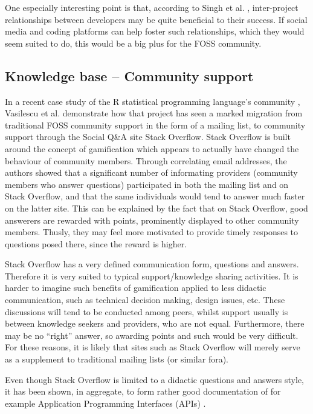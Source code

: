\documentclass[a4paper,11pt]{article} %
\begin{document}
One especially interesting point is that, according to Singh et
al. \cite{singh2011network}, inter-project relationships between developers
may be quite beneficial to their success. If social media and coding
platforms can help foster such relationships, which they would seem suited
to do, this would be a big plus for the FOSS community.

\subsection{Knowledge base -- Community support}

In a recent case study of the R statistical programming language's community
\cite{Vasilescu14StackOverflow}, Vasilescu et al. demonstrate how that
project has seen a marked migration from traditional FOSS community support
in the form of a mailing list, to community support through the Social
Q\&{}A site Stack Overflow. Stack Overflow is built around the concept of
gamification\cite{deterding2011game} which appears to actually have changed
the behaviour of community members. Through correlating email addresses, the
authors showed that a significant number of informating providers (community
members who answer questions) participated in both the mailing list and on
Stack Overflow, and that the same individuals would tend to answer much
faster on the latter site. This can be explained by the fact that on
Stack Overflow, good answerers are rewarded with points, prominently
displayed to other community members. Thusly, they may feel more motivated
to provide timely responses to questions posed there, since the reward is
higher.

Stack Overflow has a very defined communication form, questions and
answers. Therefore it is very suited to typical support/knowledge sharing
activities. It is harder to imagine such benefits of gamification applied to
less didactic communication, such as technical decision making, design
issues, etc. These discussions will tend to be conducted among peers, whilst
support usually is between knowledge seekers and providers, who are not
equal. Furthermore, there may be no ``right'' answer, so awarding points and
such would be very difficult. For these reasons, it is likely that sites
such as Stack Overflow will merely serve as a supplement to traditional
mailing lists (or similar fora).

Even though Stack Overflow is limited to a didactic questions and answers
style, it has been shown, in aggregate, to form rather good documentation of
for example Application Programming Interfaces (APIs)
\cite{parnin2012crowd}.
\end{document}
